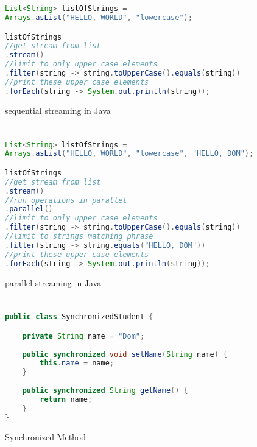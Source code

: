 \documentclass[]{report}
\begin{document}
\chapter{}
\begin{figure}[h!]
\caption{sequential streaming in Java}
\begin{lstlisting}[language=Java,frame=single]
List<String> listOfStrings = 
Arrays.asList("HELLO, WORLD", "lowercase");

listOfStrings
//get stream from list
.stream()
//limit to only upper case elements
.filter(string -> string.toUpperCase().equals(string))
//print these upper case elements
.forEach(string -> System.out.println(string));
\end{lstlisting}
\end{figure}

\chapter{}
\begin{figure}[h!]
\caption{parallel streaming in Java}
\begin{lstlisting}[language=Java,frame=single]
List<String> listOfStrings = 
Arrays.asList("HELLO, WORLD", "lowercase", "HELLO, DOM");

listOfStrings
//get stream from list
.stream()
//run operations in parallel
.parallel()
//limit to only upper case elements
.filter(string -> string.toUpperCase().equals(string))
//limit to strings matching phrase
.filter(string -> string.equals("HELLO, DOM"))
//print these upper case elements
.forEach(string -> System.out.println(string));
\end{lstlisting}
\end{figure}

\chapter{}
\begin{figure}[h!]
\caption{Synchronized Method}
\begin{lstlisting}[language=Java,frame=single]
public class SynchronizedStudent {

	private String name = "Dom";
	
	public synchronized void setName(String name) {
		this.name = name;
	}
	
	public synchronized String getName() {
		return name;
	}
}
\end{lstlisting}
\end{figure}
\end{document}
